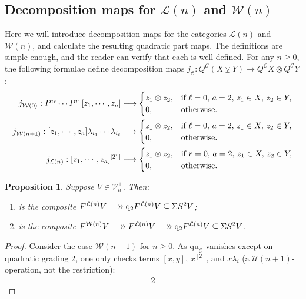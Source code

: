 \documentclass[11pt]{amsart} \renewcommand{\baselinestretch}{1.2}
\theoremstyle{plain}
\newtheorem{prop}[thm]{Proposition}
\numberwithin{equation}{section} %
\theoremstyle{plain}
\newtheorem{prop}[thm]{Proposition}
\numberwithin{equation}{chapter} %
\renewcommand{\to}{\longrightarrow}
\newcommand{\squishlist}{
}
\newcommand{\scrL}{\mathscr{L}}
\newcommand{\calU}{\mathcal{U}}
\newcommand{\calL}{\mathcal{L}}
\newcommand{\calV}{\mathcal{V}}
\newcommand{\calw}{\mathcal{W}}
\newcommand{\calc}{\mathcal{C}}
\newcommand{\restn}[1]{#1^{[2]}}
\newcommand{\restnRepeated}[2]{#1^{[2^{#2}]}}
\newcommand{\vect}[2]{\calV^{#1}_{#2}}
\newcommand{\quadratic}{\mathrm{qu}}
\newcommand{\quadgrad}[1]{\mathrm{q}_{#1}}
\newcommand{\epi}{{\,\makebox[0cm][l]{\ensuremath\to}\to{}}}
\newcommand{\restliealgs}{{\scrL\!\textit{ie}^\textit{r}}}
\newcommand{\smashcoprod}{\veebar}%
\newcommand{\SubsectionOrSection}[1]{\subsection{#1}}
\begin{document}
\begin{homotopy operations for PRLs}
\SubsectionOrSection{Decomposition maps for $\calL(n)$ and $\calw(n)$}
Here we will introduce decomposition maps for the categories $\calL(n)$ and $\calw(n)$, and calculate the resulting quadratic part maps. The definitions are simple enough, and the reader can verify that each is well defined. For any  $n\geq0$, the following formulae define decomposition maps $j_\calc:Q^\calc(X\smashcoprod Y)\to Q^\calc X\otimes Q^\calc Y$:
\begin{alignat*}{2}
j_{\calw(0)}:P^{i_\ell}\cdots P^{i_1}[z_1,\cdots ,z_a]&\longmapsto\begin{cases}
z_1\otimes z_2,&\textup{if }\ell=0,\,a=2,\,z_1\in X,\,z_2\in Y,
\\0,&\textup{otherwise.}
\end{cases}
\\
j_{\calw(n+1)}:[z_1,\cdots ,z_a]\lambda_{i_1}\cdots \lambda_{i_\ell}&\longmapsto\begin{cases}
z_1\otimes z_2,&\textup{if }\ell=0,\,a=2,\,z_1\in X,\,z_2\in Y,
\\0,&\textup{otherwise.}
\end{cases}
\\
j_{\calL(n)}:\restnRepeated{[z_1,\cdots ,z_a]}{r}&\longmapsto\begin{cases}
z_1\otimes z_2,&\textup{if }r=0,\,a=2,\,z_1\in X,\,z_2\in Y,
\\0,&\textup{otherwise.}
\end{cases}
\end{alignat*}
\begin{prop}
\label{quadpartcalc for various W and L}
Suppose $V\in\vect{+}{n}$. Then:
\begin{enumerate}\squishlist
\item \makebox[\widthof{$\quadratic_\restliealgs$}][l]{$\quadratic_{\calL(n)}$} is the composite $F^{\calL(n)} V\epi \quadgrad{2}F^{\calL(n)} V\subseteq \Sigma S^2V$;
\item \makebox[\widthof{$\quadratic_\restliealgs$}][l]{$\quadratic_{\calw(n)}$} is the composite $F^{\calw(n)} V\epi F^{\calL(n)} V\epi \quadgrad{2}F^{\calL(n)} V\subseteq \Sigma S^2V$.\end{enumerate}
\end{prop}
\begin{proof}
Consider the case $\calw(n+1)$ for $n\geq0$. As $\quadratic_\calc$ vanishes except on quadratic grading 2, one only checks terms $[x,y]$, $\restn{x}$, and $x\lambda_i$ (a $\calU(n+1)$-operation, not the restriction):
\begin{alignat*}{2}

\end{alignat*}
\end{proof}
\end{homotopy operations for PRLs}
\end{document}
